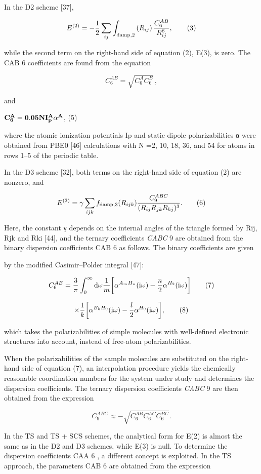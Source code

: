 \documentclass{article}
\begin{document}
In the D2 scheme [37],

$$E^{(2)}=-\frac{1}{2}\sum_{ij}\int_{\rm damp,2}\left(R_{ij}\right)\frac{C_{6}^{AB}}{R_{ij}^{6}},\tag{3}$$

while the second term on the right-hand side of equation (2), E(3), is zero. The CAB 6 coefficients are found from the equation

$$C_{6}^{AB}=\sqrt{C_{6}^{A}C_{6}^{B}}\,,\tag{4}$$

and

$\bf C_{6}^{A}=0.05NI_{p}^{A}\alpha^{A}$, (5)

where the atomic ionization potentials Ip and static dipole polarizabilities α were obtained from PBE0 [46] calculations with N =2, 10, 18, 36, and 54 for atoms in rows 1–5 of the periodic table.

In the D3 scheme [32], both terms on the right-hand side of equation (2) are nonzero, and

$$E^{(3)}=\gamma\sum_{ijk}f_{\rm damp,3}(R_{ijk})\frac{C_{9}^{ABC}}{(R_{ij}R_{jk}R_{kj})^{3}}.\tag{6}$$

Here, the constant γ depends on the internal angles of the triangle formed by Rij, Rjk and Rki [44], and the ternary coefficients \textit{CABC} 9 are obtained from the binary dispersion coefficients CAB 6 as follows. The binary coefficients are given

by the modified Casimir–Polder integral [47]:

$$C_{6}^{A B}=\frac{3}{\pi}\int_{0}^{\infty}\mathrm{d}\omega\frac{1}{m}\bigg{[}\alpha^{A_{m}H_{n}}(\mathrm{i}\omega)-\frac{n}{2}\alpha^{H_{2}}(\mathrm{i}\omega)\bigg{]}\tag{7}$$

$$\times\frac{1}{k}\bigg{[}\alpha^{B_{k}H_{0}}({\rm i}\omega)-\frac{l}{2}\alpha^{H_{0}}({\rm i}\omega)\bigg{]},\tag{8}$$

which takes the polarizabilities of simple molecules with well-defined electronic structures into account, instead of free-atom polarizabilities.

When the polarizabilities of the sample molecules are substituted on the right-hand side of equation (7), an interpolation procedure yields the chemically reasonable coordination numbers for the system under study and determines the dispersion coefficients. The ternary dispersion coefficients \textit{CABC} 9 are then obtained from the expression

$$C_{9}^{ABC}\approx-\sqrt{C_{6}^{AB}C_{6}^{AC}C_{6}^{BC}}.\tag{9}$$

In the TS and TS + SCS schemes, the analytical form for E(2) is almost the same as in the D2 and D3 schemes, while E(3) is null. To determine the dispersion coefficients CAA 6 , a different concept is exploited. In the TS approach, the parameters CAB 6 are obtained from the expression
\end{document}
